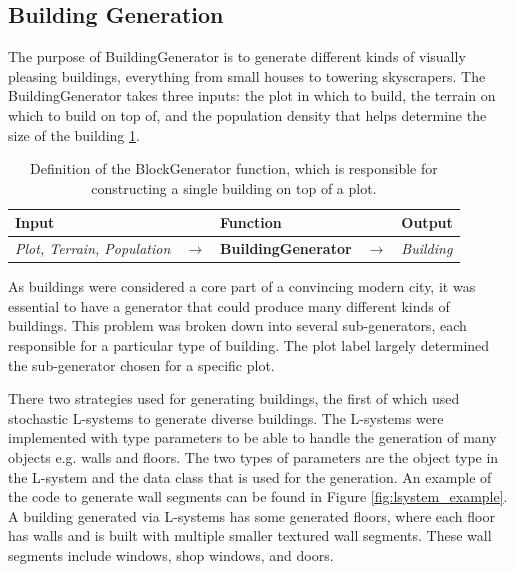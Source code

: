 \subsection{Building Generation}
The purpose of BuildingGenerator is to generate different kinds of visually pleasing buildings, everything from small houses to towering skyscrapers. 
The BuildingGenerator takes three inputs: the plot in which to build, the terrain on which to build on top of, and the population density that helps determine the size of the building \ref{table:buildinggen}.

\begin{table}[H]
  \centering
  \begin{tabular}{lllll}
    \textbf{Input}                           &               & \textbf{Function}            &               & \textbf{Output}         \\
    \midrule
    \textit{Plot, Terrain, Population}       & $\rightarrow$ & \textbf{BuildingGenerator}   & $\rightarrow$ & \textit{Building}       \\
    \bottomrule
  \end{tabular}
  
  \caption{Definition of the BlockGenerator function, which is responsible for constructing a single building on top of a plot.}
  \label{table:buildinggen} 
\end{table}
\vspace{-0.4cm} 

As buildings were considered a core part of a convincing modern city, it was essential to have a generator that could produce many different kinds of buildings. 
This problem was broken down into several sub-generators, each responsible for a particular type of building.
The plot label largely determined the sub-generator chosen for a specific plot.

There two strategies used for generating buildings, the first of which used stochastic L-systems to generate diverse buildings.
The L-systems were implemented with type parameters to be able to handle the generation of many objects e.g. walls and floors.
The two types of parameters are the object type in the L-system and the data class that is used for the generation.
An example of the code to generate wall segments can be found in Figure \ref{fig:lsystem_example}.
A building generated via L-systems has some generated floors, where each floor has walls and is built with multiple smaller textured wall segments. 
These wall segments include windows, shop windows, and doors.

